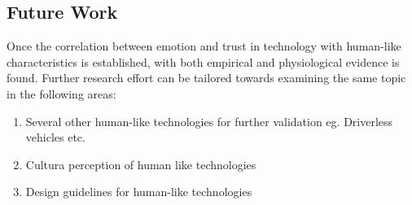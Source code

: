 \subsection {Future Work}
Once the correlation between emotion and trust in technology with human-like characteristics is established, with both empirical and physiological evidence is found. Further research effort can be tailored towards examining the same topic in the following areas:
\begin{enumerate}
    \item Several other human-like technologies for further validation eg. Driverless vehicles etc.
    \item Cultura perception  of human like technologies
    \item Design guidelines for human-like technologies
\end{enumerate}
